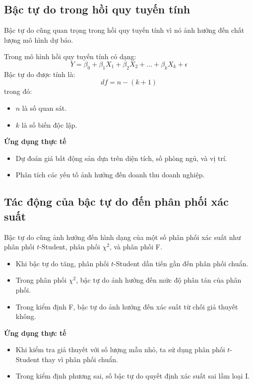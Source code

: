 \subsection{Bậc tự do trong hồi quy tuyến tính}

Bậc tự do cũng quan trọng trong hồi quy tuyến tính vì nó ảnh hưởng đến chất lượng mô hình dự báo.

Trong mô hình hồi quy tuyến tính có dạng:
\begin{equation}
Y = \beta_0 + \beta_1 X_1 + \beta_2 X_2 + \dots + \beta_k X_k + \epsilon
\end{equation}
Bậc tự do được tính là:
\begin{equation}
df = n - (k + 1)
\end{equation}
trong đó:
\begin{itemize}
    \item $n$ là số quan sát.
    \item $k$ là số biến độc lập.
\end{itemize}

\textbf{Ứng dụng thực tế}
\begin{itemize}
    \item Dự đoán giá bất động sản dựa trên diện tích, số phòng ngủ, và vị trí.
    \item Phân tích các yếu tố ảnh hưởng đến doanh thu doanh nghiệp.
\end{itemize}



\subsection{Tác động của bậc tự do đến phân phối xác suất}

Bậc tự do cũng ảnh hưởng đến hình dạng của một số phân phối xác suất như phân phối $t$-Student, phân phối $\chi^2$, và phân phối F.

\begin{itemize}

    \item Khi bậc tự do tăng, phân phối $t$-Student dần tiến gần đến phân phối chuẩn.

    \item Trong phân phối $\chi^2$, bậc tự do ảnh hưởng đến mức độ phân tán của phân phối.

    \item Trong kiểm định F, bậc tự do ảnh hưởng đến xác suất từ chối giả thuyết không.

\end{itemize}


\textbf{Ứng dụng thực tế}
\begin{itemize}
    \item Khi kiểm tra giả thuyết với số lượng mẫu nhỏ, ta sử dụng phân phối $t$-Student thay vì phân phối chuẩn.
    \item Trong kiểm định phương sai, số bậc tự do quyết định xác suất sai lầm loại I.
\end{itemize}


